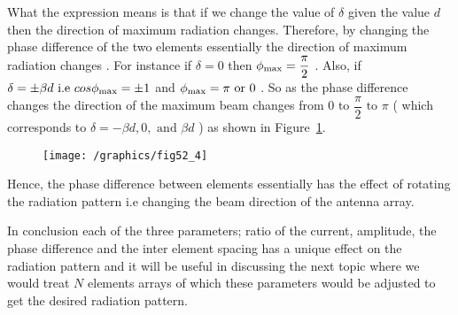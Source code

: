 What the expression means is that if we change the value of $\delta $ given the value $d $ then the direction of maximum radiation changes. Therefore, by changing the phase difference of the two elements essentially the direction of maximum radiation changes . For instance if $ \delta = 0 $ then $ \phi_{\textnormal{max}} = \dfrac{ \pi }{ 2 } $ . Also, if $ \delta = \pm \beta d \text{ i.e } cos\phi_{\textnormal{max}} = \pm 1 $ and $ \phi_{\textnormal{max}} = \pi \text{ or } 0 $ . So as the phase difference changes the direction of the maximum beam changes from $ 0 \text{ to } \dfrac{ \pi }{ 2 } \text{ to } \pi $ ( which corresponds to $ \delta = - \beta d , 0 , \text{ and } \beta d $ ) as shown in Figure~\ref{52.4}.
\begin{figure}[h]
\centering
\texttt{[image: /graphics/fig52\_4]}
\caption{}
\label{52.4}
\end{figure}

Hence, the phase difference between elements essentially has the effect of rotating the radiation pattern i.e changing the beam direction of the antenna array.

In conclusion each of the three parameters; ratio of the  current, amplitude, the phase difference and the inter element spacing has a unique effect on the radiation pattern and it will be useful in discussing the next topic where we would treat $ N $ elements arrays of which these parameters would be adjusted to get the desired radiation pattern.